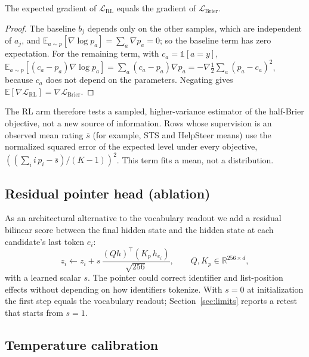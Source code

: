 \begin{proposition}
The expected gradient of $\mathcal{L}_{\text{RL}}$ equals the gradient of
$\mathcal{L}_{\text{Brier}}$.
\end{proposition}
\begin{proof}
The baseline $b_j$ depends only on the other samples, which are independent of $a_j$, and
$\mathbb{E}_{a\sim p}[\nabla\log p_a] = \sum_a \nabla p_a = 0$; so the baseline term has
zero expectation. For the remaining term, with $c_a=\mathbb{1}[a=y]$,
$\mathbb{E}_{a\sim p}\!\left[(c_a - p_a)\nabla\log p_a\right] = \sum_a (c_a-p_a)\nabla p_a
= -\nabla \tfrac12\sum_a (p_a - c_a)^2$, because $c_a$ does not depend on the parameters.
Negating gives $\mathbb{E}[\nabla\mathcal{L}_{\text{RL}}] = \nabla\mathcal{L}_{\text{Brier}}$.
\end{proof}

The RL arm therefore tests a sampled, higher-variance estimator of the half-Brier objective,
not a new source of information. Rows whose supervision is an observed mean rating
$\bar{s}$ (for example, STS and HelpSteer means) use the normalized squared error of the
expected level under every objective,
$\left(\left(\sum_i i\,p_i - \bar{s}\right)/(K-1)\right)^2$. This term fits a mean, not a
distribution.

\subsection{Residual pointer head (ablation)}
\label{sec:pointer}

As an architectural alternative to the vocabulary readout we add a residual bilinear score
between the final hidden state and the hidden state at each candidate's last token $e_i$:
\begin{equation}
  z_i \leftarrow z_i + s\,\frac{(Q h)^{\top} (K_p\, h_{e_i})}{\sqrt{256}},
  \qquad Q, K_p \in \mathbb{R}^{256\times d},
\end{equation}
with a learned scalar $s$. The pointer could correct identifier and list-position effects
without depending on how identifiers tokenize. With $s=0$ at initialization the first step
equals the vocabulary readout; Section~\ref{sec:limits} reports a retest that starts from
$s=1$.

\subsection{Temperature calibration}
\label{sec:calibration}

